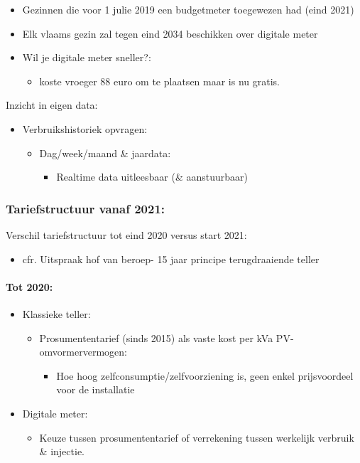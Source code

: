 \documentclass[12pt]{article}
\begin{document}
\begin{itemize}
\begin{itemize}
\begin{itemize}
            \item Gezinnen die voor 1 julie 2019 een budgetmeter toegewezen had (eind 2021)
            \item Elk vlaams gezin zal tegen eind 2034 beschikken over digitale meter 
            \item Wil je digitale meter sneller?:\begin{itemize}
                \item koste vroeger 88 euro om te plaatsen maar is nu gratis.
            \end{itemize}
        \end{itemize}
    \end{itemize}
\end{itemize}
Inzicht in eigen data:\begin{itemize}
    \item Verbruikshistoriek opvragen:\begin{itemize}
        \item Dag/week/maand \& jaardata:\begin{itemize}
            \item Realtime data uitleesbaar (\& aanstuurbaar)
        \end{itemize}
    \end{itemize}
\end{itemize}
\subsubsection{Tariefstructuur vanaf 2021:}
Verschil tariefstructuur tot eind 2020 versus start 2021:\begin{itemize}
    \item cfr. Uitspraak hof van beroep- 15 jaar principe terugdraaiende teller
\end{itemize}
\paragraph{Tot 2020:}\begin{itemize}
    \item Klassieke teller:\begin{itemize}
        \item Prosumententarief (sinds 2015) als vaste kost per kVa PV-omvormervermogen:\begin{itemize}
            \item Hoe hoog zelfconsumptie/zelfvoorziening is, geen enkel prijsvoordeel voor de installatie
        \end{itemize}
    \end{itemize}
    \item Digitale meter:\begin{itemize}
        \item Keuze tussen prosumententarief of verrekening tussen werkelijk verbruik \& injectie.
    \end{itemize}
\end{itemize}
\end{document}
